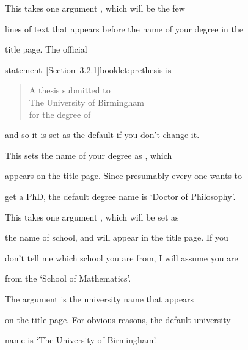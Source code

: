 \documentclass{bhamthesis}
\makeatletter
\renewcommand{\cite}{\@ifstar{\@ifstar{\HAR@acite}{\HAR@fcite}}{\HAR@acite}}
\newcommand{\bksl}{\char`\\}
\newcommand{\cmd}[1]{\texttt{\bksl{}#1}}
\newcommand{\cmdargt}[1]
\newcommand{\argt}[1]
\newcommand{\cmddessep}{\renewcommand{\labelsep}{2em}}
\makeatother
\begin{document}
\begin{description}\cmddessep

\item[\cmd{submissionstatement}\cmdargt{substate}]

 This takes one argument , which will be the few

 lines of text that appears before the name of your degree in the

 title page.  The official

 statement~\cite[Section~3.2.1]{booklet:prethesis} is

 \begin{quote}

  A thesis submitted to\\

  The University of Birmingham\\

  for the degree of

 \end{quote}

 and so it is set as the default if you don't change it.

\item[\cmd{degree}\cmdargt{degname}]

  This sets the name of your degree as , which

  appears on the title page. Since presumably every one wants to

  get a PhD, the default degree name is `Doctor of Philosophy'.

\item[\cmd{school}\cmdargt{schoolname}]

 This takes one argument , which will be set as

 the name of school, and will appear in the title page.  If you

 don't tell me which school you are from, I will assume you are

 from the `School of Mathematics'.

\item[\cmd{university}\cmdargt{uniname}]

 The argument  is the university name that appears

 on the title page.  For obvious reasons, the default university

 name is `The University of Birmingham'.

\end{description}
\end{document}
